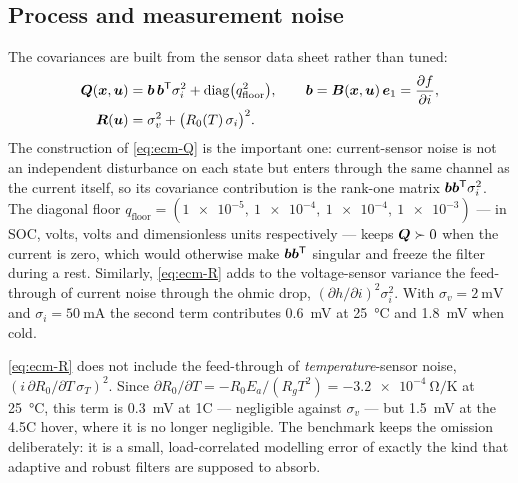 \subsection{Process and measurement noise}
The covariances are built from the sensor data sheet rather than tuned:
\begin{align}
\bm{Q}(\bm{x},\bm{u}) &= \bm{b}\,\bm{b}^{\mathsf{T}}\sigma_i^2 + \operatorname{diag}\!\big(q_{\mathrm{floor}}^2\big),
 \qquad \bm{b} = \bm{B}(\bm{x},\bm{u})\,\bm{e}_1 = \frac{\partial f}{\partial i},
\label{eq:ecm-Q}\\
\bm{R}(\bm{u}) &= \sigma_v^2 + \big(R_0(T)\,\sigma_i\big)^2 .
\label{eq:ecm-R}
\end{align}
The construction of \eqref{eq:ecm-Q} is the important one: current-sensor noise is not an
independent disturbance on each state but enters through the same channel as the current itself,
so its covariance contribution is the rank-one matrix $\bm{b}\bm{b}^{\mathsf{T}}\sigma_i^2$. The diagonal
floor $q_{\mathrm{floor}} = (\num{1e-5},\ \num{1e-4},\ \num{1e-4},\ \num{1e-3})$ --- in SOC, volts,
volts and dimensionless units respectively --- keeps $\bm{Q}\succ0$ when the current is zero, which
would otherwise make $\bm{b}\bm{b}^{\mathsf{T}}$ singular and freeze the filter during a rest. Similarly,
\eqref{eq:ecm-R} adds to the voltage-sensor variance the feed-through of current noise through
the ohmic drop, $(\partial h/\partial i)^2\sigma_i^2$. With
$\sigma_v = \SI{2}{\milli\volt}$ and $\sigma_i = \SI{50}{\milli\ampere}$ the second term
contributes \SI{0.6}{\milli\volt} at \SI{25}{\celsius} and \SI{1.8}{\milli\volt} when cold.

\begin{remark}\label{rem:ecm-Romission}
\eqref{eq:ecm-R} does not include the feed-through of \emph{temperature}-sensor noise,
$(i\,\partial R_0/\partial T\,\sigma_T)^2$. Since
$\partial R_0/\partial T = -R_0 E_a/(R_g T^2) = \SI{-3.2e-4}{\ohm\per\kelvin}$ at
\SI{25}{\celsius}, this term is \SI{0.3}{\milli\volt} at 1C --- negligible against
$\sigma_v$ --- but \SI{1.5}{\milli\volt} at the 4.5C hover, where it is no longer negligible.
The benchmark keeps the omission deliberately: it is a small, load-correlated modelling error of
exactly the kind that adaptive and robust filters are supposed to absorb.
\end{remark}

